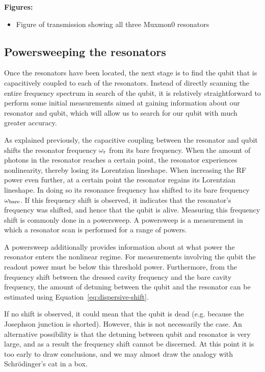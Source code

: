         \textbf{Figures:}
        \begin{itemize}
          \item Figure of transmission showing all three Muxmon0 resonators
        \end{itemize}

      \subsection{Powersweeping the resonators}
        Once the resonators have been located, the next stage is to find the qubit that is capacitively coupled to each of the resonators. Instead of directly scanning the entire frequency spectrum in search of the qubit, it is relatively straightforward to perform some initial measurements aimed at gaining information about our resonator and qubit, which will allow us to search for our qubit with much greater accuracy.

        As explained previously, the capacitive coupling between the resonator and qubit shifts the resonator frequency $\omega_\text{r}$ from its bare frequency. When the amount of photons in the resonator reaches a certain point, the resonator experiences nonlinearity, thereby losing its Lorentzian lineshape. When increasing the RF power even further, at a certain point the resonator regains its Lorentzian lineshape. In doing so its resonance frequency has shifted to its bare frequency $\omega_\text{bare}$. If this frequency shift is observed, it indicates that the resonator's frequency was shifted, and hence that the qubit is alive. Measuring this frequency shift is commonly done in a powersweep. A powersweep is a measurement in which a resonator scan is performed for a range of powers.

        A powersweep additionally provides information about at what power the resonator enters the nonlinear regime. For measurements involving the qubit the readout power must be below this threshold power. Furthermore, from the frequency shift between the dressed cavity frequency and the bare cavity frequency, the amount of detuning between the qubit and the resonator can be estimated using Equation~\ref{eq:dispersive-shift}.

        If no shift is observed, it could mean that the qubit is dead (e.g. because the Josephson junction is shorted). However, this is not necessarily the case. An alternative possibility is that the detuning between qubit and resonator is very large, and as a result the frequency shift cannot be discerned. At this point it is too early to draw conclusions, and we may almost draw the analogy with Schr\"odinger's cat in a box.

